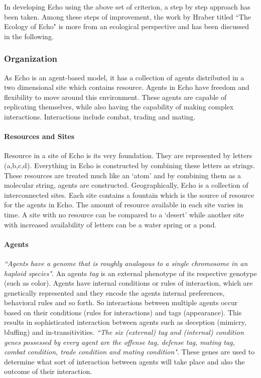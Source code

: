 In developing Echo using the above set of criterion, a step by step approach has been taken. Among these steps of improvement, the work by Hraber titled ``The Ecology of Echo" \cite{hraber1997} is more from an ecological perspective and has been discussed in the following.

\subsubsection{Organization}
As Echo is an agent-based model, it has a collection of agents distributed in a two dimensional site which contains resource. Agents in Echo have freedom and flexibility to move around this environment. These agents are capable of replicating themselves, while also having the capability of making complex interactions. Interactions include combat, trading and mating.

\paragraph{Resources and Sites}
Resource in a site of Echo is its very foundation. They are represented by letters (a,b,c,d). Everything in Echo is constructed by combining these letters as strings. These resources are treated much like an `atom' and by combining them as a molecular string, agents are constructed. Geographically, Echo is a collection of interconnected sites. Each site contains a fountain which is the source of resource for the agents in Echo. The amount of resource available in each site varies in time. A site with no resource can be compared to a `desert' while another site with increased availability of letters can be a water spring or a pond. 

\paragraph{Agents}
\textsl{``Agents have a genome that is roughly analogous to a single chromosome in an haploid species"}. An agents \textsl{tag} is an external phenotype of its respective genotype (such as color). Agents have internal conditions or rules of interaction, which are genetically represented and they encode the agents internal preferences, behavioral rules and so forth. So interactions between multiple agents occur based on their conditions (rules for interactions) and tags (appearance). This results in sophisticated interaction between agents such as deception (mimicry, bluffing) and in-transitivities. \textsl{``The six (external) tag and (internal) condition genes possessed by every agent are the offense tag, defense tag, mating tag, combat condition, trade condition and mating condition"}. These genes are used to determine what sort of interaction between agents will take place and also the outcome of their interaction. 

